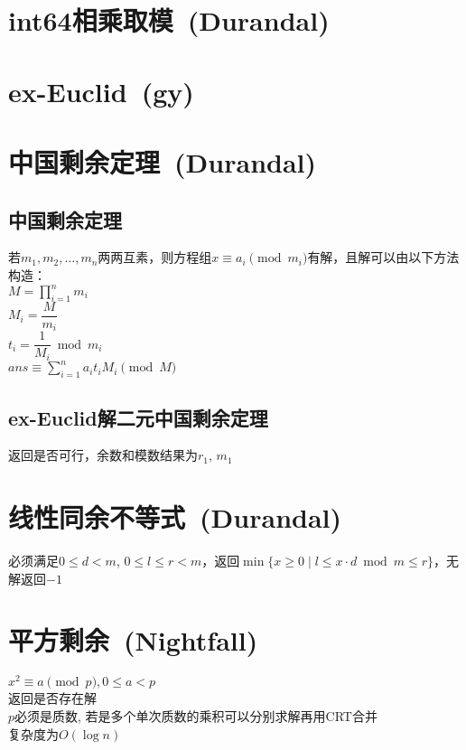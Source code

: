 \section{int64相乘取模~\small(Durandal)}

\section{ex-Euclid~\small(gy)}

\section{中国剩余定理~\small(Durandal)}
    \subsection*{中国剩余定理}
        若$ m_1, m_2, \dots, m_n $两两互素，则方程组$ x \equiv a_i \pmod{m_i} $有解，且解可以由以下方法构造：
        \\$ M = \prod\limits_{i = 1}^{n} m_i $
        \\$ M_i = \dfrac{M}{m_i} $
        \\$ t_i = \dfrac{1}{M_i} \bmod m_i $
        \\$ ans \equiv \sum\limits_{i = 1}^{n} a_i t_i M_i \pmod M $
    \subsection*{ex-Euclid解二元中国剩余定理}
        返回是否可行，余数和模数结果为$ r_1 $, $ m_1 $

\section{线性同余不等式~\small(Durandal)}
    必须满足$ 0 \leq d < m $, $ 0 \leq l \leq r < m $，返回$ \min\lbrace x \geq 0 \mid l \leq x \cdot d \bmod m \leq r \rbrace $，无解返回$ -1 $ 

\section{平方剩余~\small(Nightfall)}
    $ x^2 \equiv a \pmod p, 0 \leq a < p $
    \\返回是否存在解
    \\$ p $必须是质数, 若是多个单次质数的乘积可以分别求解再用CRT合并
    \\复杂度为$ O(\log n) $

